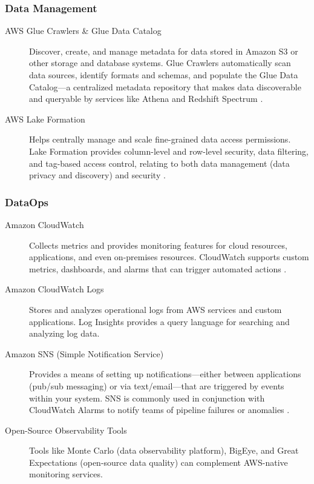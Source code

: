 \documentclass{article}
\begin{document}
\subsubsection{Data Management}
\begin{description}
    \item[AWS Glue Crawlers \& Glue Data Catalog] Discover, create, and manage metadata for data stored in Amazon S3 or other storage and database systems. Glue Crawlers automatically scan data sources, identify formats and schemas, and populate the Glue Data Catalog---a centralized metadata repository that makes data discoverable and queryable by services like Athena and Redshift Spectrum \cite{aws2023glue}.

    \item[AWS Lake Formation] Helps centrally manage and scale fine-grained data access permissions. Lake Formation provides column-level and row-level security, data filtering, and tag-based access control, relating to both data management (data privacy and discovery) and security \cite{aws2023lakeformation}.
\end{description}

\subsubsection{DataOps}
\begin{description}
    \item[Amazon CloudWatch] Collects metrics and provides monitoring features for cloud resources, applications, and even on-premises resources. CloudWatch supports custom metrics, dashboards, and alarms that can trigger automated actions \cite{aws2023cloudwatch}.

    \item[Amazon CloudWatch Logs] Stores and analyzes operational logs from AWS services and custom applications. Log Insights provides a query language for searching and analyzing log data.

    \item[Amazon SNS (Simple Notification Service)] Provides a means of setting up notifications---either between applications (pub/sub messaging) or via text/email---that are triggered by events within your system. SNS is commonly used in conjunction with CloudWatch Alarms to notify teams of pipeline failures or anomalies \cite{aws2023sns}.

    \item[Open-Source Observability Tools] Tools like Monte Carlo (data observability platform), BigEye, and Great Expectations (open-source data quality) can complement AWS-native monitoring services.
\end{description}
\end{document}
